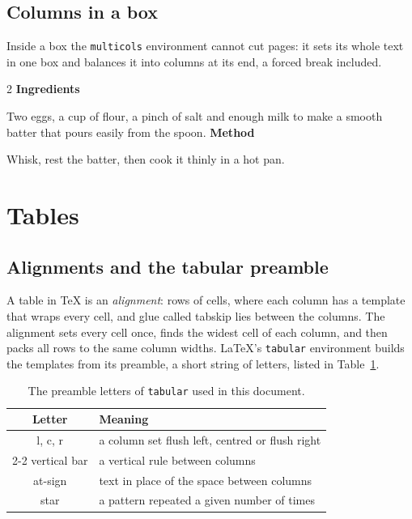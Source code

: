 \documentclass{article}
\numberwithin{equation}{section}
\theoremstyle{definition}
\theoremstyle{remark}
\begin{document}
\subsection{Columns in a box}\label{sec:boxedcols}
Inside a box the \texttt{multicols} environment cannot cut pages: it sets its whole text
in one box and balances it into columns at its end, a forced break included.
\begin{tcolorbox}[colback=gray!5,colframe=gray!60]
\begin{multicols}{2}
\textbf{Ingredients}\par\smallskip
Two eggs, a cup of flour, a pinch of salt and enough milk to make a smooth batter that
pours easily from the spoon.
\columnbreak
\textbf{Method}\par\smallskip
Whisk, rest the batter, then cook it thinly in a hot pan.
\end{multicols}
\end{tcolorbox}

\section{Tables}\label{sec:tables}

\subsection{Alignments and the tabular preamble}

A table in \TeX{} is an \emph{alignment}: rows of cells, where each column has a
template that wraps every cell, and glue called tabskip lies between the columns. The
alignment sets every cell once, finds the widest cell of each column, and then packs all
rows to the same column widths. \LaTeX's \texttt{tabular} environment builds the
templates from its preamble, a short string of letters, listed in
Table~\ref{tab:preamble}.

\begin{table}[h]
\centering
\begin{tabular}{|c|l|}
\hline
Letter & Meaning \\
\hline\hline
l, c, r & a column set flush left, centred or flush right \\
\cline{2-2}
vertical bar & a vertical rule between columns \\
at-sign & text in place of the space between columns \\
star & a pattern repeated a given number of times \\
\hline
\end{tabular}
\caption{The preamble letters of \texttt{tabular} used in this document.}\label{tab:preamble}
\end{table}
\end{document}

